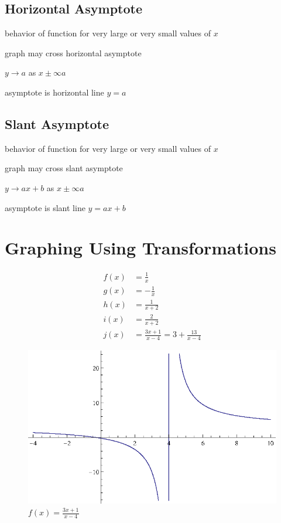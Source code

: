 \documentclass{exam}
\begin{document}
  \subsection{Horizontal Asymptote}
  \begin{itemize*}
    \item behavior of function for very large or very small values of $x$
    \item graph may cross horizontal asymptote
    \item $y \rightarrow a$ as $x \pm \infty a$
    \item asymptote is horizontal line $y = a$
  \end{itemize*}

  \subsection{Slant Asymptote}
  \begin{itemize*}
    \item behavior of function for very large or very small values of $x$
    \item graph may cross slant asymptote
    \item $y \rightarrow ax + b$ as $x \pm \infty a$
    \item asymptote is slant line $y = ax + b$
  \end{itemize*}

  \pagebreak

  \section{Graphing Using Transformations}

  \begin{align*}
    f(x) &= \frac{1}{x} \\
    g(x) &= -\frac{1}{x} \\
    h(x) &= \frac{1}{x + 2} \\
    i(x) &= \frac{2}{x + 2} \\
    j(x) &= \frac{3x + 1}{x - 4} = 3 + \frac{13}{x - 4}
  \end{align*}

  \begin{figure}[H]
    \centering
    \includegraphics[scale=1.0]{figure1.eps}
    \caption*{$f(x) = \frac{3x + 1}{x - 4}$}
  \end{figure}
\end{document}
